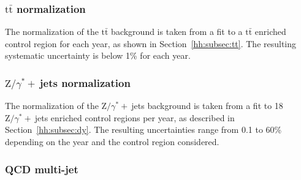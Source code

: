 \documentclass[../main.tex]{subfiles}
\begin{document}
\subsubsection*{$\text{t}\bar{\text{t}}$ normalization}

The normalization of the $\text{t}\bar{\text{t}}$ background is taken from a fit to a $\text{t}\bar{\text{t}}$ enriched control region for each year, as shown in Section~\ref{hh:subsec:tt}. The resulting systematic uncertainty is below 1\% for each year.

\subsubsection*{$\text{Z}/\gamma^*+~$jets normalization}

The normalization of the $\text{Z}/\gamma^*+~$jets background is taken from a fit to 18 $\text{Z}/\gamma^*+~$jets enriched control regions per year, as described in Section~\ref{hh:subsec:dy}. The resulting uncertainties range from 0.1 to 60\% depending on the year and the control region considered.

\subsubsection*{QCD multi-jet}
\end{document}
